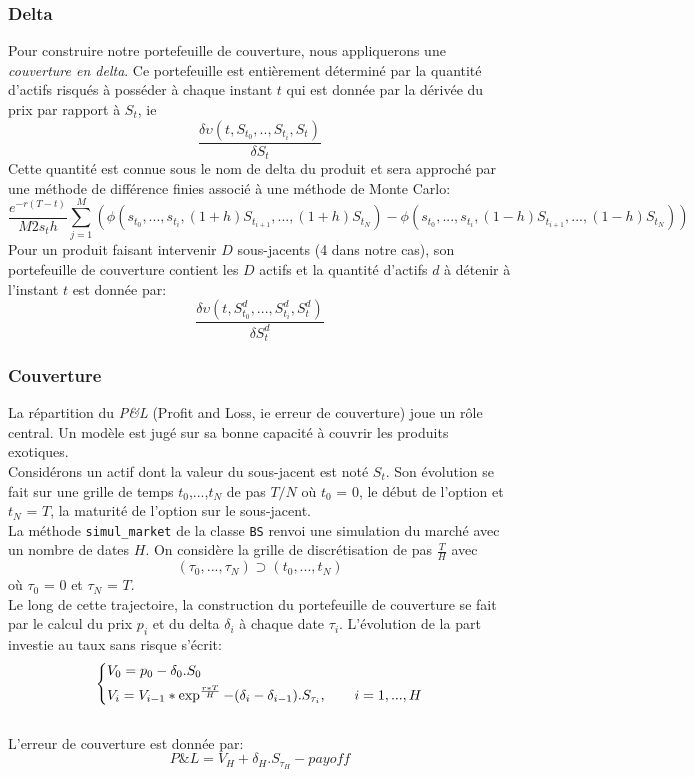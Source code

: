 \documentclass[french,12pt,a4paper]{article}
\begin{document}
\subsubsection{Delta}

Pour construire notre portefeuille de couverture, nous appliquerons une \textit{couverture en delta}. Ce portefeuille est entièrement déterminé par la quantité d'actifs risqués à posséder à chaque instant $t$ qui est donnée par la dérivée du prix par rapport à $S_{t}$, ie
$$ \frac{\delta\upsilon(t, S_{t_{0}},.., S_{t_{i}}, S_{t})}{\delta S_{t}} $$
Cette quantité est connue sous le nom de delta du produit et sera approché par une méthode de différence finies associé à une méthode de Monte Carlo:
$$ \frac{e^{-r(T-t)}}{M2s_{t}h}\sum_{j=1}^{M}(\phi(s_{t_{0}},...,s_{t_{i}},(1+h)S_{t_{i+1}},...,(1+h)S_{t_{N}})-\phi(s_{t_{0}},...,s_{t_{i}},(1-h)S_{t_{i+1}},...,(1-h)S_{t_{N}}))$$
Pour un produit faisant intervenir $D$ sous-jacents (4 dans notre cas), son portefeuille de couverture contient les $D$ actifs et la quantité d'actifs $d$ à détenir à l'instant $t$ est donnée par:
$$ \frac{\delta\upsilon(t, S_{t_{0}}^{d},...,S_{t_{i}}^{d},S_{t}^{d})}{\delta S_{t}^{d}} $$

\subsubsection{Couverture}

La répartition du \textit{P\&L} (Profit and Loss, ie erreur de couverture) joue un rôle central. Un modèle est jugé sur sa bonne capacité à couvrir les produits exotiques.\\
Considérons un actif dont la valeur du sous-jacent est noté $S_{t}$. Son évolution se fait sur une grille de temps {$t_{0}$,...,$t_{N}$} de pas $T/N$ où ${t_{0}}$ = $0$, le début de l'option et ${t_{N}}$ = $T$, la maturité de l'option sur le sous-jacent.\\
La méthode \lstinline!simul_market! de la classe \lstinline!BS! renvoi une simulation du marché avec un nombre de dates $H$. On considère la grille de discrétisation de pas $\frac{T}{H}$ avec
$$(\tau_{0},...,\tau_{N}) \supset (t_{0},...,t_{N})$$ 
où
 $\tau_{0}$ = $0$ et $\tau_{N}$ = $T$.\\
Le long de cette trajectoire, la construction du portefeuille de couverture se fait par le calcul du prix $p_{i}$ et du delta $\delta_{i}$ à chaque date $\tau_{i}$. L'évolution de la part investie au taux sans risque s'écrit:\\
$$
  \left\{%
     \vspace{-3ex}
        \begin{aligned}
          & V_{0} = p_{0}-\delta_{0}.S_{0} \\
          & V_{i} = V_{i-1}*\exp^{\frac{r*T}{H}}-(\delta_{i}-\delta_{i-1}).S_{\tau_{i}}, \hspace{7 mm}  i=1,...,H 
        \end{aligned}
 \right.
 $$
\\
L'erreur de couverture est donnée par:
 $$P\&L = V_{H}+\delta_{H}.S_{\tau_{H}}-payoff$$
\end{document}

